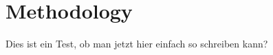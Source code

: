
\chapter{Methodology}
\label{chapter:Methodology}
Dies ist ein Test, ob man jetzt hier einfach so schreiben kann?